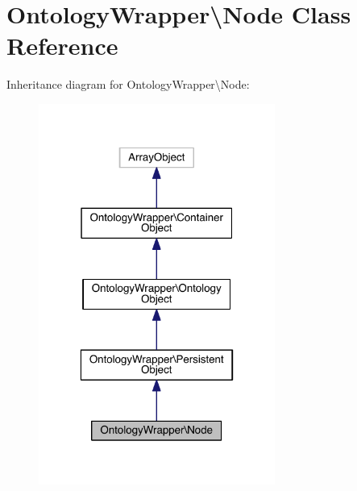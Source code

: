 \hypertarget{class_ontology_wrapper_1_1_node}{\section{Ontology\-Wrapper\textbackslash{}Node Class Reference}
\label{class_ontology_wrapper_1_1_node}
}


Inheritance diagram for Ontology\-Wrapper\textbackslash{}Node\-:
\nopagebreak
\begin{figure}[H]
\begin{center}
\leavevmode
\includegraphics[width=220pt]{class_ontology_wrapper_1_1_node__inherit__graph}
\end{center}
\end{figure}


